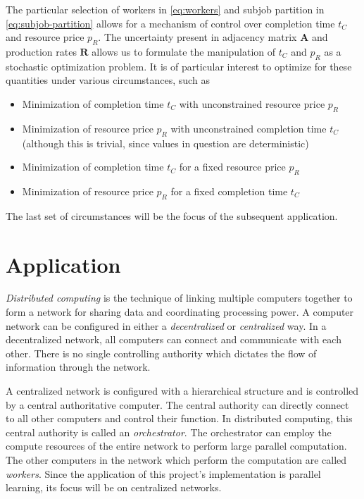 \documentclass[../mthe-493-project-proposal.tex]{subfiles}
\begin{document}
    The particular selection of workers in \eqref{eq:workers} and subjob partition in \eqref{eq:subjob-partition} allows for a mechanism of control over completion time $t_C$ and resource price $p_R$. The uncertainty present in adjacency matrix $\mathbf{A}$ and production rates $\mathbf{R}$ allows us to formulate the manipulation of $t_C$ and $p_R$ as a stochastic optimization problem. It is of particular interest to optimize for these quantities under various circumstances, such as
    \begin{itemize}
        \item Minimization of completion time $t_C$ with unconstrained resource price $p_R$
        \item Minimization of resource price $p_R$ with unconstrained completion time $t_C$ (although this is trivial, since values in question are deterministic)
        \item Minimization of completion time $t_C$ for a fixed resource price $p_R$
        \item Minimization of resource price $p_R$ for a fixed completion time $t_C$
    \end{itemize}
    The last set of circumstances will be the focus of the subsequent application.

    \section{Application}
    \label{sec:application}

    \textit{Distributed computing} is the technique of linking multiple computers together to form a network for sharing data and coordinating processing power. A computer network can be configured in either a \textit{decentralized} or \textit{centralized} way. In a decentralized network, all computers can connect and communicate with each other. There is no single controlling authority which dictates the flow of information through the network.

    A centralized network is configured with a hierarchical structure and is controlled by a central authoritative computer. The central authority can directly connect to all other computers and control their function. In distributed computing, this central authority is called an \textit{orchestrator}. The orchestrator can employ the compute resources of the entire network to perform large parallel computation. The other computers in the network which perform the computation are called \textit{workers}. Since the application of this project's implementation is parallel learning, its focus will be on centralized networks.
\end{document}
